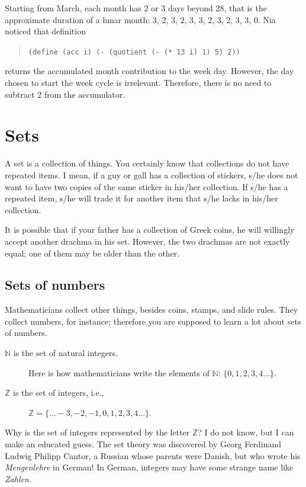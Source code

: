 \documentclass[a4paper,12pt]{book}
\begin{document}
Starting from March, each month
has 2 or 3 days beyond 28, that is
the approximate duration of a lunar
month: 3, 2,
3, 2, 3, 3, 2, 3, 2, 3, 3, 0.
Nia noticed that definition
\begin{quote}
\verb|(define (acc i) (- (quotient (- (* 13 i) 1) 5) 2))|
\end{quote}
returns the accumulated month contribution
to the week day.
However, the day chosen to start
the week cycle is irrelevant. Therefore,
there is no need to subtract 2 from the
accumulator.

\chapter{Sets}
A set is a collection of things. You certainly know that
collections do not have repeated items. I mean, if a guy or gall has
a collection of stickers, s/he does not want to have two
copies of the same sticker in his/her collection. If s/he has a
repeated item, s/he will trade it for another item that s/he lacks
in his/her collection.


It is possible that if your father has a collection of Greek
coins, he will willingly accept another drachma in his set.
However, the two drachmas are not exactly equal; one of them may be older
than the other.

\section{Sets of numbers}
Mathematicians collect other things, besides
coins, stamps, and slide rules. They collect numbers, for instance;
therefore you are supposed to learn a lot about sets of numbers.
\begin{description}
\item[$\mathbb{N}$ is the set of natural integers.] Here is how mathematicians  write the
elements of $\mathbb{N}$: $\{0,1,2,3,4\ldots\}$.
\item[$\mathbb{Z}$ is the set of integers, i.e.,] $\mathbb{Z}=\{\ldots-3, -2, -1, 0, 1, 2, 3, 4\ldots\}$.
\end{description}


Why is the set of integers represented by the letter $\mathbb{Z}$? I do not know,
but I can make an educated guess. The set theory was discovered by Georg Ferdinand
Ludwig Philipp Cantor, a Russian whose parents were Danish, but who  wrote
his {\em Mengenlehre} in German! In German, integers may have some strange name like {\em Zahlen}.
\end{document}
